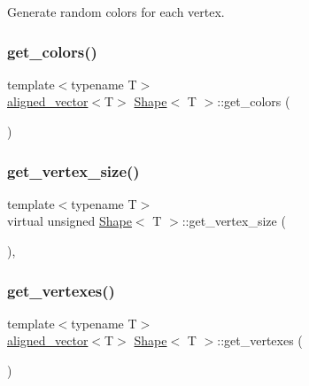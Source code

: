 Generate random colors for each vertex. 

\mbox{\label{classShape_aabe9bd208b0ece9824cb45deccc11ba7}} 
\subsubsection{\texorpdfstring{get\+\_\+colors()}{get\_colors()}}
{\footnotesize\ttfamily template$<$typename T$>$ \\
\mbox{\hyperlink{type__definitions_8hpp_accb98a876f193a416d9c8a02fe22d526}{aligned\+\_\+vector}}$<$T$>$ \mbox{\hyperlink{classShape}{Shape}}$<$ T $>$\+::get\+\_\+colors (\begin{DoxyParamCaption}{ }\end{DoxyParamCaption})\hspace{0.3cm}{\ttfamily [inline]}}

\mbox{\label{classShape_a58713d8cf7c4175e7c76eae75c94bc13}} 
\subsubsection{\texorpdfstring{get\+\_\+vertex\+\_\+size()}{get\_vertex\_size()}}
{\footnotesize\ttfamily template$<$typename T$>$ \\
virtual unsigned \mbox{\hyperlink{classShape}{Shape}}$<$ T $>$\+::get\+\_\+vertex\+\_\+size (\begin{DoxyParamCaption}{ }\end{DoxyParamCaption})\hspace{0.3cm}{\ttfamily [inline]}, {\ttfamily [virtual]}}

\mbox{\label{classShape_a3729bbdd0c4e4f3379498734807bb545}} 
\subsubsection{\texorpdfstring{get\+\_\+vertexes()}{get\_vertexes()}}
{\footnotesize\ttfamily template$<$typename T$>$ \\
\mbox{\hyperlink{type__definitions_8hpp_accb98a876f193a416d9c8a02fe22d526}{aligned\+\_\+vector}}$<$T$>$ \mbox{\hyperlink{classShape}{Shape}}$<$ T $>$\+::get\+\_\+vertexes (\begin{DoxyParamCaption}{ }\end{DoxyParamCaption})\hspace{0.3cm}{\ttfamily [inline]}}

